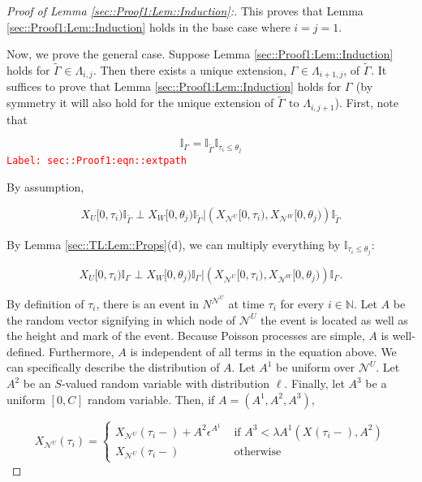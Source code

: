 \documentclass[12pt]{article}
\newcommand{\mb}{\mathbb}
\newcommand{\mc}{\mathcal}
\newcommand{\te}{\text}
\newcommand{\ep}{\epsilon}
\newcommand{\tr}{\textcolor{red}}
\newcommand{\labe}[1]{\tr{\texttt{Label: #1}}}
\newcommand{\ind}{\hspace{24pt}}
\renewcommand{\U}{U}							%
\newcommand{\UU}{W}								%
\renewcommand{\S}{S}							%
\newcommand{\ev}{\ep}							%
\newcommand{\X}{X}								%
\newcommand{\neigh}{\mc{N}}						%
\newcommand{\vind}[1]{^{#1}}					%
\newcommand{\cind}[1]{_{#1}}					%
\newcommand{\tp}[1]{(#1)}						%
\newcommand{\tip}[1]{#1}						%
\newcommand{\const}{C}							%
\newcommand{\poiss}{N}							%
\newcommand{\Sm}{\ell}							%
\newcommand{\rate}{\lambda}						%
\newcommand{\alt}[1]{\widetilde{#1}}			%
\newcommand{\indx}[1]{_{#1}}					%
\newcommand{\rt}{\tau}							%
\newcommand{\rtt}{\theta}						%
\newcommand{\apath}{\Gamma}						%
\newcommand{\pathset}[2]{\Lambda_{#1,#2}}		%
\newcommand{\rv}{A}								%
\begin{document}
\begin{proof}[Proof of Lemma \ref{sec::Proof1:Lem::Induction}:]
This proves that Lemma \ref{sec::Proof1:Lem::Induction} holds in the base case where \(i = j = 1\).

\ind Now, we prove the general case. Suppose Lemma \ref{sec::Proof1:Lem::Induction} holds for \(\alt{\apath\indx{}} \in \pathset{i}{j}\). Then there exists a unique extension, \(\apath\indx{} \in \pathset{i+1}{j}\), of \(\alt{\apath\indx{}}\). It suffices to prove that Lemma \ref{sec::Proof1:Lem::Induction} holds for \(\apath\indx{}\) (by symmetry it will also hold for the unique extension of \(\alt{\apath\indx{}} \te{ to } \pathset{i}{j+1}\)). First, note that

\begin{equation}
\mb{I}_{\apath\indx{}} = \mb{I}_{\alt{\apath\indx{}}}\mb{I}_{\rt\indx{i} \leq \rtt\indx{j}}
\label{sec::Proof1:eqn::extpath}
\end{equation}
\labe{sec::Proof1:eqn::extpath}

By assumption,

\[\X\cind{\U}\tip{[0,\rt\indx{i})}\mb{I}_{\alt{\apath\indx{}}}\perp \X\cind{\UU}\tip{[0,\rtt\indx{j})}\mb{I}_{\alt{\apath\indx{}}}|\left(\X\cind{\neigh\vind{\U}}\tip{[0,\rt\indx{i})},\X\cind{\neigh\vind{\UU}}\tip{[0,\rtt\indx{j})}\right)\mb{I}_{\alt{\apath\indx{}}}\]

By Lemma \ref{sec::TL:Lem::Props}(d), we can multiply everything by \(\mb{I}_{\rt\indx{i} \leq \rtt\indx{j}}\):

\[\X\cind{\U}\tip{[0,\rt\indx{i})}\mb{I}_{\apath\indx{}}\perp \X\cind{\UU}\tip{[0,\rtt\indx{j})}\mb{I}_{\apath\indx{}}|\left(\X\cind{\neigh\vind{\U}}\tip{[0,\rt\indx{i})},\X\cind{\neigh\vind{\UU}}\tip{[0,\rtt\indx{j})}\right)\mb{I}_{\apath\indx{}}.\]

By definition of \(\rt\indx{i}\), there is an event in \(\poiss\vind{\neigh\vind{\U}}\) at time \(\rt\indx{i}\) for every \(i \in \mb{ N}\). Let \(\rv\) be the random vector signifying in which node of \(\neigh\vind{\U}\) the event is located as well as the height and mark of the event. Because Poisson processes are simple, \(\rv\) is well-defined. Furthermore, \(\rv\) is independent of all terms in the equation above. We can specifically describe the distribution of \(\rv\). Let \(\rv^1\) be uniform over \(\neigh\vind{\U}\). Let \(\rv^2\) be an \(\S\)-valued random variable with distribution \(\Sm\). Finally, let \(\rv^3\) be a uniform \([0,\const\indx{}]\) random variable. Then, if \(\rv=(\rv^1,\rv^2,\rv^3)\),

\[\X\cind{\neigh\vind{\U}}\tp{\rt\indx{i}} = \begin{cases}
\X\cind{\neigh\vind{\U}}\tp{\rt\indx{i}-} + \rv^2\ev\vind{\rv^1} &\te{ if } \rv^3< \rate{\rv^1}(\X\cind{}\tp{\rt\indx{i}-}, \rv^2)\\
\X\cind{\neigh\vind{\U}}\tp{\rt\indx{i}-} &\te{ otherwise}
\end{cases}\]


\end{proof}
\end{document}
